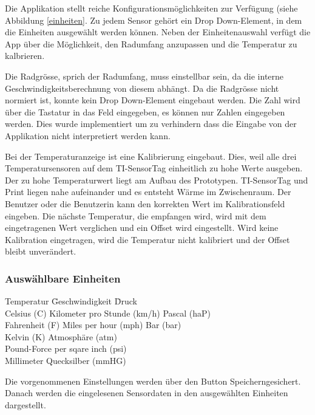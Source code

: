 Die Applikation stellt reiche Konfigurationsmöglichkeiten zur Verfügung (siehe Abbildung \ref{einheiten}. Zu jedem Sensor gehört ein Drop Down-Element, in dem die Einheiten ausgewählt werden können. Neben der Einheitenauswahl verfügt die App über die Möglichkeit, den Radumfang anzupassen und die Temperatur zu kalbrieren. 

Die Radgrösse, sprich der Radumfang, muss einstellbar sein, da die interne Geschwindigkeitsberechnung von diesem abhängt. Da die Radgrösse nicht normiert ist, konnte kein Drop Down-Element eingebaut werden. Die Zahl wird über die Tastatur in das Feld eingegeben, es können nur Zahlen eingegeben werden. Dies wurde implementiert um zu verhindern dass die Eingabe von der Applikation nicht interpretiert werden kann.

Bei der Temperaturanzeige ist eine Kalibrierung eingebaut. Dies, weil alle drei Temperatursensoren auf dem TI-SensorTag einheitlich zu hohe Werte ausgeben. Der zu hohe Temperaturwert liegt am Aufbau des Prototypen. TI-SensorTag und Print liegen nahe aufeinander und es entsteht Wärme im Zwischenraum. Der Benutzer oder die Benutzerin kann den korrekten Wert im Kalibrationsfeld eingeben. Die nächste Temperatur, die empfangen wird, wird mit dem eingetragenen Wert verglichen und ein Offset wird eingestellt. Wird keine Kalibration eingetragen, wird die Temperatur nicht kalibriert und der Offset bleibt unverändert.

\subsubsection*{Auswählbare Einheiten}
\begin{tabbing}
    Temperatur     \quad\= Geschwindigkeit            \quad\= Druck \\[0.8ex]
    Celsius (C)    \> Kilometer pro Stunde (km/h)\> Pascal (haP)\\
    Fahrenheit (F) \> Miles per hour (mph)       \> Bar (bar)\\
    Kelvin (K)     \>                            \> Atmosph\"{a}re (atm)\\
                   \>                      \> Pound-Force per sqare inch (psi)\\
                   \>                      \> Millimeter Quecksilber (mmHG)\\
\end{tabbing} 

  
Die vorgenommenen Einstellungen werden über den Button \glqq Speichern\grqq gesichert. Danach werden die eingelesenen Sensordaten in den ausgewählten Einheiten dargestellt.

